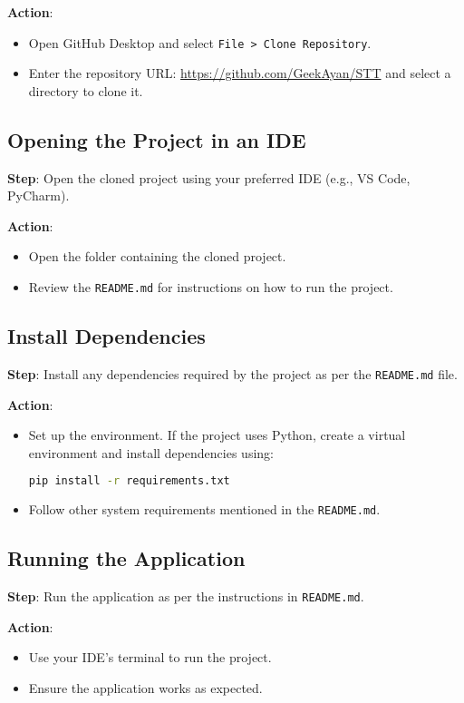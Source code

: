\documentclass[a4paper,12pt]{article}
\begin{document}
\textbf{Action}:
\begin{itemize}
    \item Open GitHub Desktop and select \texttt{File > Clone Repository}.
    \item Enter the repository URL: \url{https://github.com/GeekAyan/STT} and select a directory to clone it.
\end{itemize}

\subsection{Opening the Project in an IDE}
\textbf{Step}: Open the cloned project using your preferred IDE (e.g., VS Code, PyCharm).

\textbf{Action}:
\begin{itemize}
    \item Open the folder containing the cloned project.
    \item Review the \texttt{README.md} for instructions on how to run the project.
\end{itemize}

\subsection{Install Dependencies}
\textbf{Step}: Install any dependencies required by the project as per the \texttt{README.md} file.

\textbf{Action}:
\begin{itemize}
    \item Set up the environment. If the project uses Python, create a virtual environment and install dependencies using:
    \begin{lstlisting}[language=bash]
    pip install -r requirements.txt
    \end{lstlisting}
    \item Follow other system requirements mentioned in the \texttt{README.md}.
\end{itemize}

\subsection{Running the Application}
\textbf{Step}: Run the application as per the instructions in \texttt{README.md}.

\textbf{Action}:
\begin{itemize}
    \item Use your IDE's terminal to run the project.
    \item Ensure the application works as expected.
\end{itemize}
\newpage
\end{document}
